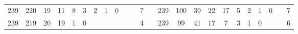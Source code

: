 {\begin{tabular}{cccccccccccclccccccccccc}
239                                                & 220                                                & 19                                               & 11                                               & 8                                                & 3                                                & 2                                               & 1                                               & 0                                               &                                                 &                                                 & 7                                                &                          & 239                                                & 100                                                & 39                                               & 22                                               & 17                                              & 5                                               & 2                                               & 1                                               & 0                                               &                                                 & 7                                                \\
239                                                & 219                                                & 20                                               & 19                                               & 1                                                & 0                                                &                                                 &                                                 &                                                 &                                                 &                                                 & 4                                                &                          & 239                                                & 99                                                 & 41                                               & 17                                               & 7                                               & 3                                               & 1                                               & 0                                               &                                                 &                                                 & 6                                                \\

\end{tabular}}
